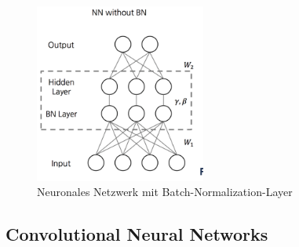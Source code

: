 \documentclass{llncs}
\begin{document}
\begin{figure}[htbp] 
	\centering
	\includegraphics[width=0.5\textwidth]{batchnorm.png}
	\caption{Neuronales Netzwerk mit Batch-Normalization-Layer\protect\cite{batchnormweb}}
	\label{fig:Bild6}
\end{figure}
\subsection{Convolutional Neural Networks}
\end{document}
